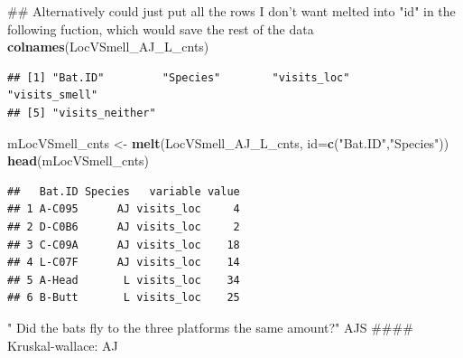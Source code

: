 \documentclass[]{article}
\newenvironment{Shaded}{\begin{snugshade}}{\end{snugshade}}
\newcommand{\KeywordTok}[1]{\textcolor[rgb]{0.13,0.29,0.53}{\textbf{{#1}}}}
\newcommand{\DataTypeTok}[1]{\textcolor[rgb]{0.13,0.29,0.53}{{#1}}}
\newcommand{\StringTok}[1]{\textcolor[rgb]{0.31,0.60,0.02}{{#1}}}
\newcommand{\NormalTok}[1]{{#1}}
\begin{document}
\begin{Shaded}
\begin{Highlighting}[]
\NormalTok{## Alternatively could just put all the rows I don't want melted into "id" in the following fuction, which would save the rest of the data}
\KeywordTok{colnames}\NormalTok{(LocVSmell_AJ_L_cnts)}
\end{Highlighting}
\end{Shaded}

\begin{verbatim}
## [1] "Bat.ID"         "Species"        "visits_loc"     "visits_smell"  
## [5] "visits_neither"
\end{verbatim}

\begin{Shaded}
\begin{Highlighting}[]
\NormalTok{mLocVSmell_cnts <-}\StringTok{ }\KeywordTok{melt}\NormalTok{(LocVSmell_AJ_L_cnts, }\DataTypeTok{id=}\KeywordTok{c}\NormalTok{(}\StringTok{"Bat.ID"}\NormalTok{,}\StringTok{"Species"}\NormalTok{))}
\KeywordTok{head}\NormalTok{(mLocVSmell_cnts)}
\end{Highlighting}
\end{Shaded}

\begin{verbatim}
##   Bat.ID Species   variable value
## 1 A-C095      AJ visits_loc     4
## 2 D-C0B6      AJ visits_loc     2
## 3 C-C09A      AJ visits_loc    18
## 4 L-C07F      AJ visits_loc    14
## 5 A-Head       L visits_loc    34
## 6 B-Butt       L visits_loc    25
\end{verbatim}

\begin{Shaded}
\end{Shaded}

" Did the bats fly to the three platforms the same amount?" AJS \#\#\#\#
Kruskal-wallace: AJ

\begin{Shaded}
\end{Shaded}
\end{document}
